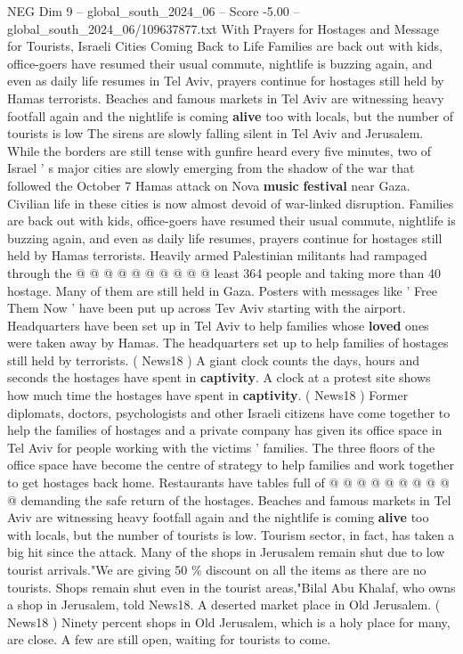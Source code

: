 \begin{textsample}{NEG Dim 9 – global\_south\_2024\_06 – Score -5.00 – global\_south\_2024\_06/109637877.txt}  \label{ex:f9_neg_356}
With Prayers for Hostages and Message for Tourists, Israeli Cities Coming Back to Life Families are back out with kids, office-goers have resumed their usual commute, nightlife is buzzing again, and even as daily life resumes in Tel Aviv, prayers continue for hostages still held by Hamas terrorists.
Beaches and famous markets in Tel Aviv are witnessing heavy footfall again and the nightlife is coming \textbf{alive} too with locals, but the number of tourists is low The sirens are slowly falling silent in Tel Aviv and Jerusalem.
While the borders are still tense with gunfire heard every five minutes, two of Israel ' s major cities are slowly emerging from the shadow of the war that followed the October 7 Hamas attack on Nova \textbf{music} \textbf{festival} near Gaza.
Civilian life in these cities is now almost devoid of war-linked disruption.
Families are back out with kids, office-goers have resumed their usual commute, nightlife is buzzing again, and even as daily life resumes, prayers continue for hostages still held by Hamas terrorists.
Heavily armed Palestinian militants had rampaged through the @ @ @ @ @ @ @ @ @ @ least 364 people and taking more than 40 hostage.
Many of them are still held in Gaza.
Posters with messages like ' Free Them Now ' have been put up across Tev Aviv starting with the airport.
Headquarters have been set up in Tel Aviv to help families whose \textbf{loved} ones were taken away by Hamas.
The headquarters set up to help families of hostages still held by terrorists. ( News18 ) A giant clock counts the days, hours and seconds the hostages have spent in \textbf{captivity}.
A clock at a protest site shows how much time the hostages have spent in \textbf{captivity}. ( News18 ) Former diplomats, doctors, psychologists and other Israeli citizens have come together to help the families of hostages and a private company has given its office space in Tel Aviv for people working with the victims ' families.
The three floors of the office space have become the centre of strategy to help families and work together to get hostages back home.
Restaurants have tables full of @ @ @ @ @ @ @ @ @ @ demanding the safe return of the hostages.
Beaches and famous markets in Tel Aviv are witnessing heavy footfall again and the nightlife is coming \textbf{alive} too with locals, but the number of tourists is low.
Tourism sector, in fact, has taken a big hit since the attack.
Many of the shops in Jerusalem remain shut due to low tourist arrivals."We are giving 50 \% discount on all the items as there are no tourists.
Shops remain shut even in the tourist areas,"Bilal Abu Khalaf, who owns a shop in Jerusalem, told News18.
A deserted market place in Old Jerusalem. ( News18 ) Ninety percent shops in Old Jerusalem, which is a holy place for many, are close.
A few are still open, waiting for tourists to come.

\end{textsample}
